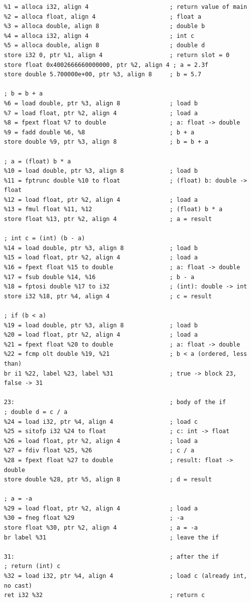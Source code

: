 \documentclass[11pt,a4paper]{article}
\begin{document}
\begin{lstlisting}
%1 = alloca i32, align 4                       ; return value of main
%2 = alloca float, align 4                     ; float a
%3 = alloca double, align 8                    ; double b
%4 = alloca i32, align 4                       ; int c
%5 = alloca double, align 8                    ; double d
store i32 0, ptr %1, align 4                   ; return slot = 0
store float 0x4002666660000000, ptr %2, align 4 ; a = 2.3f
store double 5.700000e+00, ptr %3, align 8     ; b = 5.7

; b = b + a
%6 = load double, ptr %3, align 8              ; load b
%7 = load float, ptr %2, align 4               ; load a
%8 = fpext float %7 to double                  ; a: float -> double
%9 = fadd double %6, %8                        ; b + a
store double %9, ptr %3, align 8               ; b = b + a

; a = (float) b * a
%10 = load double, ptr %3, align 8             ; load b
%11 = fptrunc double %10 to float              ; (float) b: double -> float
%12 = load float, ptr %2, align 4              ; load a
%13 = fmul float %11, %12                      ; (float) b * a
store float %13, ptr %2, align 4               ; a = result

; int c = (int) (b - a)
%14 = load double, ptr %3, align 8             ; load b
%15 = load float, ptr %2, align 4              ; load a
%16 = fpext float %15 to double                ; a: float -> double
%17 = fsub double %14, %16                     ; b - a
%18 = fptosi double %17 to i32                 ; (int): double -> int
store i32 %18, ptr %4, align 4                 ; c = result

; if (b < a)
%19 = load double, ptr %3, align 8             ; load b
%20 = load float, ptr %2, align 4              ; load a
%21 = fpext float %20 to double                ; a: float -> double
%22 = fcmp olt double %19, %21                 ; b < a (ordered, less than)
br i1 %22, label %23, label %31                ; true -> block 23, false -> 31

23:                                            ; body of the if
; double d = c / a
%24 = load i32, ptr %4, align 4                ; load c
%25 = sitofp i32 %24 to float                  ; c: int -> float
%26 = load float, ptr %2, align 4              ; load a
%27 = fdiv float %25, %26                      ; c / a
%28 = fpext float %27 to double                ; result: float -> double
store double %28, ptr %5, align 8              ; d = result

; a = -a
%29 = load float, ptr %2, align 4              ; load a
%30 = fneg float %29                           ; -a
store float %30, ptr %2, align 4               ; a = -a
br label %31                                   ; leave the if

31:                                            ; after the if
; return (int) c
%32 = load i32, ptr %4, align 4                ; load c (already int, no cast)
ret i32 %32                                    ; return c
\end{lstlisting}
\end{document}
